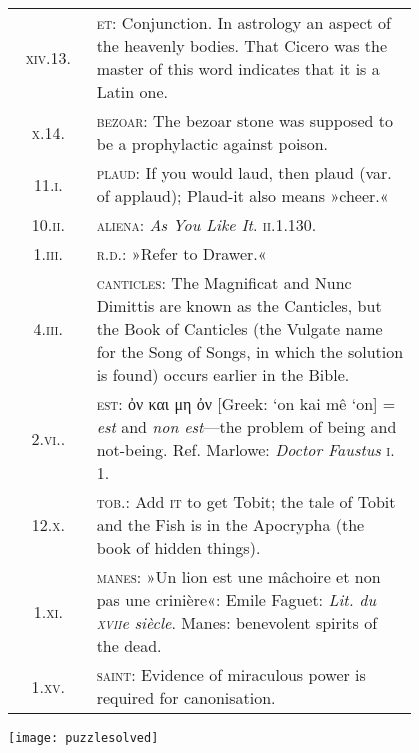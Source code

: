 \begin{longtable} {c p{0.8\linewidth}}
\textsc{xiv}.13. & \textsc{et}: Conjunction. In astrology an aspect of the heavenly bodies. That Cicero was the master of this word indicates that it is a Latin one.\\

\textsc{x}.14. & \textsc{bezoar}: The bezoar stone was supposed to be a prophylactic against poison.\\

11.\textsc{i.} & \textsc{plaud}: If you would laud, then plaud (var. of applaud); Plaud-it also means »cheer.«\\

10.\textsc{ii.} &  \textsc{aliena}: \textit{As You Like It}. \textsc{ii}.1.130.\\

1.\textsc{iii.} &  \textsc{r.d.}: »Refer to Drawer.«\\

4.\textsc{iii.} &  \textsc{canticles}: The Magnificat and Nunc Dimittis are known as the Canticles, but the Book of Canticles (the Vulgate name for the Song of Songs, in which the solution is found) occurs earlier in the Bible.\\

2.\textsc{vi.}. &  \textsc{est}: ὀν και μη ὀν [Greek: `on kai mê `on] = \textit{est} and \textit{non est}—the problem of being and not-being. Ref. Marlowe: \textit{Doctor Faustus} \textsc{i}. 1.\\

12.\textsc{x.} &  \textsc{tob}.: Add \textsc{it} to get Tobit; the tale of Tobit and the Fish is in the Apocrypha (the book of hidden things).\\

1.\textsc{xi.} &  \textsc{manes}: »Un lion est une mâchoire et non pas une crinière«: Emile Faguet: \textit{Lit. du \textsc{xvii}e siècle}. Manes: benevolent spirits of the dead.\\

1.\textsc{xv}. &  \textsc{saint}: Evidence of miraculous power is required for canonisation.\\
\end{longtable}

\texttt{[image: puzzlesolved]}